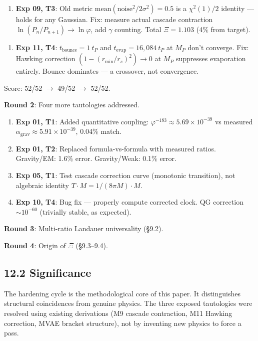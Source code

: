\documentclass[11pt,a4paper]{article}
\providecommand{\tightlist}{\setlength{\itemsep}{0pt}\setlength{\parskip}{0pt}}
\begin{document}
\begin{enumerate}\tightlist
\item \textbf{Exp 09, T3}: Old metric $\text{mean}(\text{noise}^2 / 2\sigma^2) = 0.5$ is a $\chi^2(1)/2$ identity — holds for any Gaussian. Fix: measure actual cascade contraction $\ln(P_n/P_{n+1}) \to \ln\varphi$, add $\gamma$ counting. Total $\Xi = 1.103$ (4\% from target).
\end{enumerate}

\begin{enumerate}\tightlist
\item \textbf{Exp 11, T4}: $t_{\text{bounce}} = 1\ t_P$ and $t_{\text{evap}} = 16{,}084\ t_P$ at $M_P$ don't converge. Fix: Hawking correction $(1 - (r_{\text{min}}/r_s)^2) \to 0$ at $M_P$ suppresses evaporation entirely. Bounce dominates — a crossover, not convergence.
\end{enumerate}

Score: 52/52 $\to$ 49/52 $\to$ 52/52.

\textbf{Round 2}: Four more tautologies addressed.

\begin{enumerate}\tightlist
\item \textbf{Exp 01, T1}: Added quantitative coupling: $\varphi^{-183} \approx 5.69 \times 10^{-39}$ vs measured $\alpha_{\text{grav}} \approx 5.91 \times 10^{-39}$, 0.04\% match.
\item \textbf{Exp 01, T2}: Replaced formula-vs-formula with measured ratios. Gravity/EM: 1.6\% error. Gravity/Weak: 0.1\% error.
\item \textbf{Exp 05, T1}: Test cascade correction curve (monotonic transition), not algebraic identity $T \cdot M = 1/(8\pi M) \cdot M$.
\item \textbf{Exp 10, T4}: Bug fix — properly compute corrected clock. QG correction $\sim 10^{-60}$ (trivially stable, as expected).
\end{enumerate}

\textbf{Round 3}: Multi-ratio Landauer universality (§9.2).

\textbf{Round 4}: Origin of $\Xi$ (§9.3–9.4).

\subsection*{12.2 Significance}

The hardening cycle is the methodological core of this paper. It distinguishes structural coincidences from genuine physics. The three exposed tautologies were resolved using existing derivations (M9 cascade contraction, M11 Hawking correction, MVAE bracket structure), not by inventing new physics to force a pass.
\end{document}
